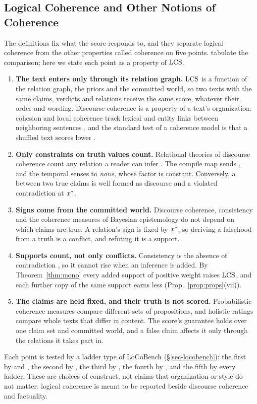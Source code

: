 \subsection{Logical Coherence and Other Notions of Coherence}
\label{sec:notions}

The definitions fix what the score responds to, and they separate logical coherence from the other
properties called coherence on five points. \citet{anonlocobench} tabulate the comparison; here we
state each point as a property of $\mathrm{LCS}$.
\begin{enumerate}[leftmargin=1.4em,itemsep=1pt,topsep=2pt]
\item \textbf{The text enters only through its relation graph.} $\mathrm{LCS}$ is a function of the
  relation graph, the priors and the committed world, so two texts with the same claims, verdicts
  and relations receive the same score, whatever their order and wording. Discourse coherence is a
  property of a text's organization: cohesion and local coherence track lexical and entity links
  between neighboring sentences \citep{hallidayhasan1976,grosz1995}, and the standard test of a
  coherence model is that a shuffled text scores lower \citep{barzilay}.
\item \textbf{Only constraints on truth values count.} Relational theories of discourse coherence
  count any relation a reader can infer \citep{hobbs1979,mann}. The compile map sends
  ,  and the temporal senses to \emph{none}, whose factor is
  constant. Conversely, a  between two true claims is well formed as discourse
  and a violated contradiction at $x^{\ast}$.
\item \textbf{Signs come from the committed world.} Discourse coherence, consistency and the
  coherence measures of Bayesian epistemology \citep{shogenji1999,olsson2002} do not depend on
  which claims are true. A relation's sign is fixed by $x^{\ast}$, so deriving a falsehood from a truth
  is a conflict, and refuting it is a support.
\item \textbf{Supports count, not only conflicts.} Consistency is the absence of contradiction
  \citep{summac,selfcheckgpt,mundler2024}, so it cannot rise when an inference is added. By
  Theorem~\ref{thm:mono} every added support of positive weight raises $\mathrm{LCS}$, and each further
  copy of the same support earns less (Prop.~\ref{prop:props}(vii)).
\item \textbf{The claims are held fixed, and their truth is not scored.} Probabilistic coherence
  measures compare different sets of propositions, and holistic ratings \citep{summeval,geval}
  compare whole texts that differ in content. The score's guarantee holds over one claim set and
  committed world, and a false claim affects it only through the relations it takes part in.
\end{enumerate}
Each point is tested by a ladder type of LoCoBench (\S\ref{sec-locobench}): the first by
 and , the second by , the third by , the fourth by
, and the fifth by every ladder. These are choices of construct, not claims that
organization or style do not matter: logical coherence is meant to be reported beside discourse
coherence and factuality.

